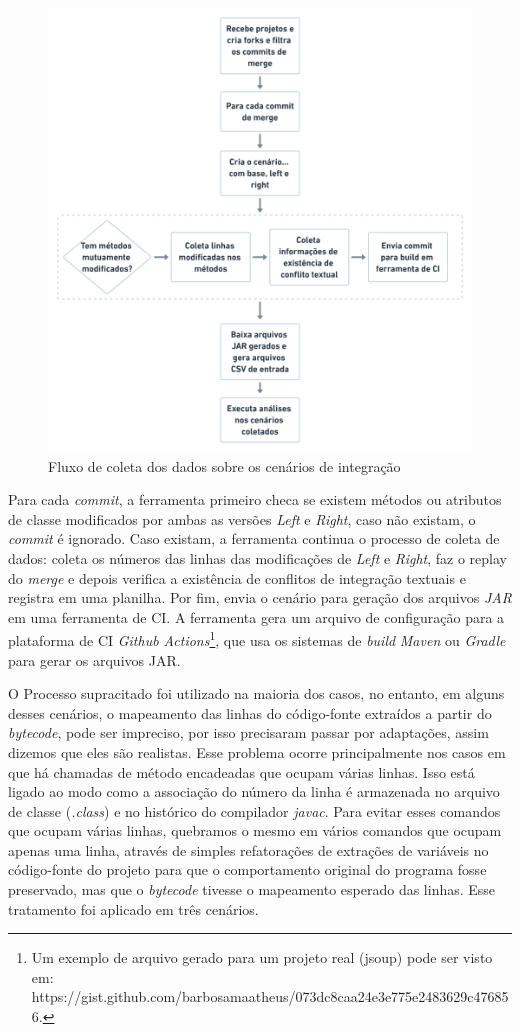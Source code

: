 \begin{figure}[!h]
    \centering
    \includegraphics[width=0.8\linewidth]{samples/images/Fluxo de mineracao.png}
    \caption{Fluxo de coleta dos dados sobre os cenários de integração}
    \label{fig:mineracao}
\end{figure}

Para cada \emph{commit}, a ferramenta primeiro checa se existem métodos ou atributos de classe modificados por ambas as versões \emph{Left} e \emph{Right}, caso não existam, o \emph{commit} é ignorado. Caso existam, a ferramenta continua o processo de coleta de dados: coleta os números das linhas das modificações de \emph{Left} e \emph{Right}, faz o replay do \emph{merge} e depois verifica a existência de conflitos de integração textuais e registra em uma planilha. Por fim, envia o cenário para geração dos arquivos \emph{JAR} em uma ferramenta de CI. A ferramenta gera um arquivo de configuração para a plataforma de CI \emph{Github Actions}\footnote{Um exemplo de arquivo gerado para um projeto real (jsoup) pode ser visto em: https://gist.github.com/barbosamaatheus/073dc8caa24e3e775e2483629c476856.
}, que usa os sistemas de \emph{build} \emph{Maven} ou \emph{Gradle} para gerar os arquivos JAR.


O Processo supracitado foi utilizado na maioria dos casos, no entanto, em alguns desses cenários, o mapeamento das linhas do código-fonte extraídos a partir do \emph{bytecode}, pode ser impreciso, por isso precisaram passar por adaptações, assim dizemos que eles são realistas. Esse problema ocorre principalmente nos casos em que há chamadas de método encadeadas que ocupam várias linhas. Isso está ligado ao modo como a associação do número da linha é armazenada no arquivo de classe (\emph{.class}) e no histórico do compilador \emph{javac}. Para evitar esses comandos que ocupam várias linhas, quebramos o mesmo em vários comandos que ocupam apenas uma linha, através de simples refatorações de extrações de variáveis no código-fonte do projeto para que o comportamento original do programa fosse preservado, mas que o \emph{bytecode} tivesse o mapeamento esperado das linhas. Esse tratamento foi aplicado em três cenários.

